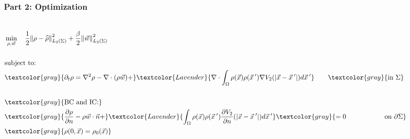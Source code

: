 \documentclass[aspectratio=169,xcolor=dvipsnames]{beamer}
\begin{document}
\begin{frame}
	\frametitle{Part 2: Optimization}
	\begin{columns}


		\begin{align*}
		&\min_{\rho,\vec{w}} \quad \frac{1}{2}\norm{\rho- \widehat{\rho}}_{L_2(\Sigma)}^2 + \frac{\beta}{2} \norm{\vec{w}}_{L_2(\Sigma)}^2\\
		\\
		&\text{subject to:}
		\\
		&\textcolor{gray}{ \partial_t \rho = \nabla^2 \rho - \nabla \cdot (\rho \vec{w})+}\textcolor{Lavender}{\nabla \cdot \int_\Omega \rho(\vec{x}) \rho(\vec{x}\hspace{0.2em}') \nabla V_2(|\vec{x}-\vec{x}\hspace{0.2em}'|)d\vec{x}\hspace{0.2em}'} \qquad \textcolor{gray}{ \text{in    } \Sigma}\\
		\\
		&\textcolor{gray}{\text{BC } \text{and IC:}}\\
		&\textcolor{gray}{\frac{\partial \rho}{\partial n} - \rho \vec{w} \cdot \vec{n} +}\textcolor{Lavender}{ \int_\Omega \rho(\vec{x}) \rho(\vec{x}\hspace{0.2em}')  \frac{ \partial  V_2}{\partial n}(|\vec{x}-\vec{x}\hspace{0.2em}'|)d\vec{x}\hspace{0.2em}'} \textcolor{gray}{= 0 \quad \ \ \qquad \qquad \text{on   } \partial \Sigma  } \\
		&\textcolor{gray}{\rho(0,\vec{x}) = \rho_0(\vec{x})} 
		\end{align*}
		\vspace{-1cm}
		\begin{figure}	
			\includegraphics[width=3cm]{bloodcells.jpg}\\
			\includegraphics[width=3cm]{bacteria.png}\\			
			\includegraphics[width=3cm]{Microfilter.png}\\
			\includegraphics[width=3cm]{beer.png}
		\end{figure}
	\end{columns}
\end{frame}
\end{document}
